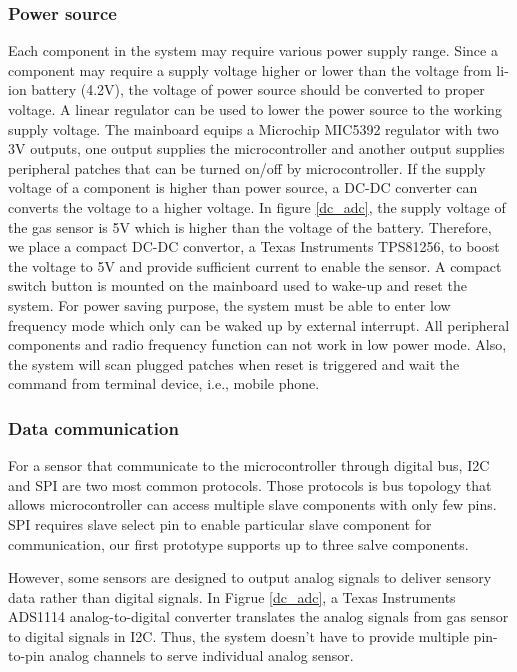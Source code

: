 \subsubsection{Power source}
Each component in the system may require various power supply range. Since a component may require a supply voltage higher or lower than the voltage from li-ion battery (4.2V), the voltage of power source should be converted to proper voltage. A linear regulator can be used to lower the power source to the working supply voltage. The mainboard equips a Microchip MIC5392 regulator with two 3V outputs, one output supplies the microcontroller and another output supplies peripheral patches that can be turned on/off by microcontroller. If the supply voltage of a component is higher than power source, a DC-DC converter can converts the voltage to a higher voltage. In figure \ref{dc_adc}, the supply voltage of the gas sensor is 5V which is higher than the voltage of the battery. Therefore, we place a compact DC-DC convertor, a Texas Instruments TPS81256, to boost the voltage to 5V and provide sufficient current to enable the sensor.
A compact switch button is mounted on the mainboard used to wake-up and reset the system. For power saving purpose, the system must be able to enter low frequency mode which only can be waked up by external interrupt. All peripheral components and radio frequency function can not work in low power mode. Also, the system will scan plugged patches when reset is triggered and wait the command from terminal device, i.e., mobile phone. 

\vspace{10pt}
\subsubsection{Data communication}
For a sensor that communicate to the microcontroller through digital bus, I2C and SPI are two most common protocols. Those protocols is bus topology that allows microcontroller can access multiple slave components with only few pins. SPI requires slave select pin to enable particular slave component for communication, our first prototype supports up to three salve components. 

However, some sensors are designed to output analog signals to deliver sensory data rather than digital signals. In Figrue \ref{dc_adc}, a Texas Instruments ADS1114 analog-to-digital converter translates the analog signals from gas sensor to digital signals in I2C. Thus, the system doesn't have to provide multiple pin-to-pin analog channels to serve individual analog sensor. 


